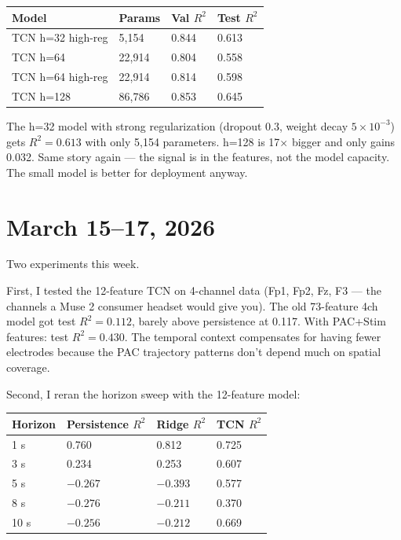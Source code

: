 \documentclass[11pt,letterpaper]{article}
\begin{document}
\vspace{0.5em}
\begin{tabular}{@{}llll@{}}
\toprule
\textbf{Model}        & \textbf{Params} & \textbf{Val $R^2$} & \textbf{Test $R^2$} \\
\midrule
TCN h=32 high-reg     & 5,154           & 0.844              & 0.613 \\
TCN h=64              & 22,914          & 0.804              & 0.558 \\
TCN h=64 high-reg     & 22,914          & 0.814              & 0.598 \\
TCN h=128             & 86,786          & 0.853              & 0.645 \\
\bottomrule
\end{tabular}
\vspace{0.5em}

The h=32 model with strong regularization (dropout 0.3, weight decay $5 \times 10^{-3}$) gets
$R^2 = 0.613$ with only 5,154 parameters. h=128 is 17$\times$ bigger and only gains 0.032.
Same story again --- the signal is in the features, not the model capacity. The small model
is better for deployment anyway.

\section*{March 15--17, 2026}

Two experiments this week.

First, I tested the 12-feature TCN on 4-channel data (Fp1, Fp2, Fz, F3 --- the channels a
Muse 2 consumer headset would give you). The old 73-feature 4ch model got test $R^2 = 0.112$,
barely above persistence at 0.117. With PAC+Stim features: test $R^2 = 0.430$. The temporal
context compensates for having fewer electrodes because the PAC trajectory patterns don't
depend much on spatial coverage.

Second, I reran the horizon sweep with the 12-feature model:

\vspace{0.5em}
\begin{tabular}{@{}llll@{}}
\toprule
\textbf{Horizon} & \textbf{Persistence $R^2$} & \textbf{Ridge $R^2$} & \textbf{TCN $R^2$} \\
\midrule
1 s  & 0.760  & 0.812  & 0.725 \\
3 s  & 0.234  & 0.253  & 0.607 \\
5 s  & $-0.267$ & $-0.393$ & 0.577 \\
8 s  & $-0.276$ & $-0.211$ & 0.370 \\
10 s & $-0.256$ & $-0.212$ & 0.669 \\
\bottomrule
\end{tabular}
\vspace{0.5em}
\end{document}
